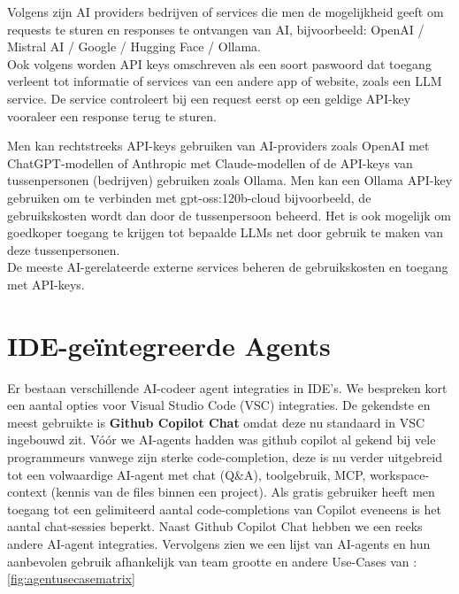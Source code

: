 Volgens \textcite{JabRef} zijn AI providers bedrijven of services die men de mogelijkheid geeft om requests te sturen en responses te ontvangen van AI, bijvoorbeeld: OpenAI / Mistral AI / Google / Hugging Face / Ollama. \\

Ook volgens \textcite{JabRef} worden API keys omschreven als een soort paswoord dat toegang verleent tot informatie of services van een andere app of website, zoals een LLM service. De service controleert bij een request eerst op een geldige API-key vooraleer een response terug te sturen. \\

Men kan rechtstreeks API-keys gebruiken van AI-providers zoals OpenAI met ChatGPT-modellen of Anthropic met Claude-modellen of de API-keys van tussenpersonen (bedrijven) gebruiken zoals Ollama. Men kan een Ollama API-key gebruiken om te verbinden met gpt-oss:120b-cloud bijvoorbeeld, de gebruikskosten wordt dan door de tussenpersoon beheerd. Het is ook mogelijk om goedkoper toegang te krijgen tot bepaalde LLMs net door gebruik te maken van deze tussenpersonen. \\

De meeste AI-gerelateerde externe services beheren de gebruikskosten en toegang met API-keys.

\section{IDE-geïntegreerde Agents}
\label{sec:idegeintegreerdeagents}

Er bestaan verschillende AI-codeer agent integraties in IDE's. We bespreken kort een aantal opties voor Visual Studio Code (VSC) integraties. De gekendste en meest gebruikte is \textbf{Github Copilot Chat} omdat deze nu standaard in VSC ingebouwd zit. Vóór we AI-agents hadden was github copilot al gekend bij vele programmeurs vanwege zijn sterke code-completion, deze is nu verder uitgebreid tot een volwaardige AI-agent met chat (Q\&A), toolgebruik, MCP, workspace-context (kennis van de files binnen een project). Als gratis gebruiker heeft men toegang tot een gelimiteerd aantal code-completions van Copilot eveneens is het aantal chat-sessies beperkt. Naast Github Copilot Chat hebben we een reeks andere AI-agent integraties. Vervolgens zien we een lijst van AI-agents en hun aanbevolen gebruik afhankelijk van team grootte en andere Use-Cases van \autocite{Teixeira2025}: \ref{fig:agentusecasematrix}\\

